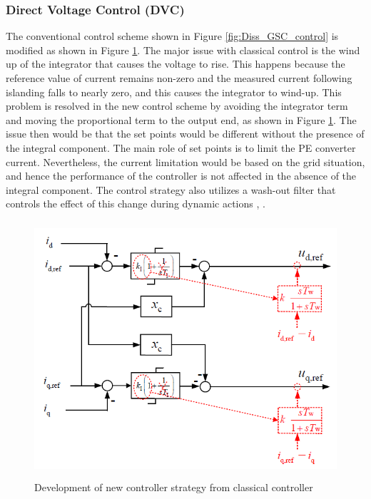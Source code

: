 \subsubsection{Direct Voltage Control (DVC)}\label{DVC_theory}
The conventional control scheme shown in Figure \ref{fig:Diss_GSC_control} is modified as shown in Figure \ref{fig:Diss_DVC_control}. The major issue with classical control is the wind up of the integrator that causes the voltage to rise. This happens because the reference value of current remains non-zero and the measured current following islanding falls to nearly zero, and this causes the integrator to wind-up. This problem is resolved in the new control scheme by avoiding the integrator term and moving the proportional term to the output end, as shown in Figure \ref{fig:Diss_DVC_control}. The issue then would be that the set points would be different without the presence of the integral component. The main role of set points is to limit the \gls{PE} converter current. Nevertheless, the current limitation would be based on the grid situation, and hence the performance of the controller is not affected in the absence of the integral component. The control strategy also utilizes a wash-out filter that controls the effect of this change during dynamic actions \cite{korai_dynamic_2019}, \cite{erlich_new_2017}.         
\begin{figure}[H]
\centering
    \includegraphics[height = 9.5cm,width = 11.5cm]{Diagrams/Chapter_2/Diss_DVC_control.PNG}
    \caption{ Development of new controller strategy from classical controller \cite{erlich_new_2017}}
    \label{fig:Diss_DVC_control}
\end{figure}

